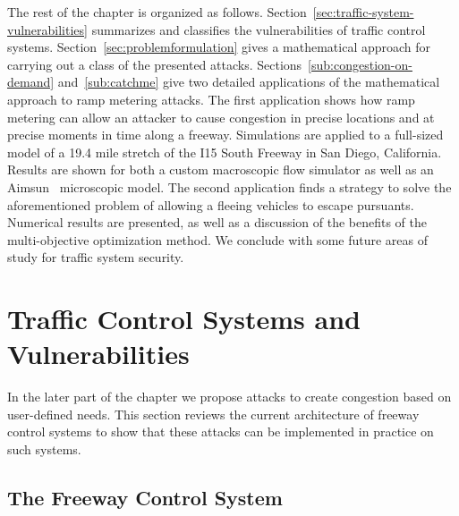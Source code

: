 The rest of the chapter is organized as follows. Section~\ref{sec:traffic-system-vulnerabilities} summarizes and classifies the vulnerabilities of traffic control systems. Section~\ref{sec:problemformulation} gives a mathematical approach for carrying out a class of the presented attacks.  Sections~\ref{sub:congestion-on-demand} and~\ref{sub:catchme} give two detailed applications of the mathematical approach to ramp metering attacks. The first application shows how ramp metering can allow an attacker to cause congestion in precise locations and at precise moments in time along a freeway. Simulations are applied to a full-sized model of a 19.4 mile stretch of the I15 South Freeway in San Diego, California. Results are shown for both a custom macroscopic flow simulator as well as an Aimsun~\cite{barcelo2005microscopic} microscopic model. The second application finds a strategy to solve the aforementioned problem of allowing a fleeing vehicles to escape pursuants. Numerical results are presented, as well as a discussion of the benefits of the multi-objective optimization method. We conclude with some future areas of study for traffic system security.


\section{Traffic Control Systems and Vulnerabilities}

In the later part of the chapter we propose attacks to create congestion based on user-defined needs. This section reviews the current architecture of freeway control systems to show that these attacks can be implemented in practice on such systems.

	\subsection{The Freeway Control System}
	\label{sub:freeway-control-system}

